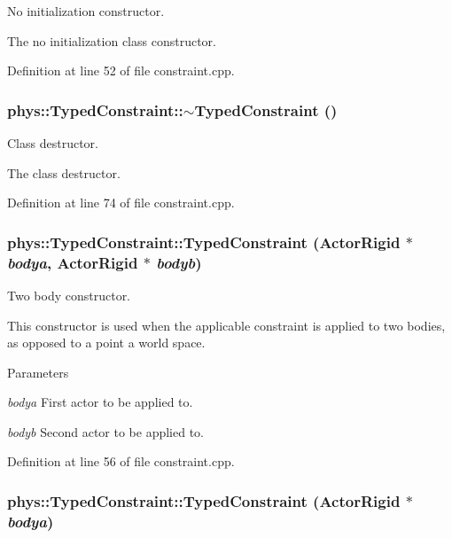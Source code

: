 No initialization constructor. 

The no initialization class constructor. 

Definition at line 52 of file constraint.cpp.

\hypertarget{classphys_1_1TypedConstraint_abf1cb6e3cf5c62feac31805162ec2766}{
\subsubsection[{$\sim$TypedConstraint}]{\setlength{\rightskip}{0pt plus 5cm}phys::TypedConstraint::$\sim$TypedConstraint ()}}
\label{d1/d17/classphys_1_1TypedConstraint_abf1cb6e3cf5c62feac31805162ec2766}


Class destructor. 

The class destructor. 

Definition at line 74 of file constraint.cpp.

\hypertarget{classphys_1_1TypedConstraint_a50ca8631a6c75bbc609c8d4ed61fdcee}{
\subsubsection[{TypedConstraint}]{\setlength{\rightskip}{0pt plus 5cm}phys::TypedConstraint::TypedConstraint ({\bf ActorRigid} $\ast$ {\em bodya}, \/  {\bf ActorRigid} $\ast$ {\em bodyb})}}
\label{d1/d17/classphys_1_1TypedConstraint_a50ca8631a6c75bbc609c8d4ed61fdcee}


Two body constructor. 

This constructor is used when the applicable constraint is applied to two bodies, as opposed to a point a world space. 
\begin{DoxyParams}{Parameters}
\item[{\em bodya}]First actor to be applied to. \item[{\em bodyb}]Second actor to be applied to. \end{DoxyParams}


Definition at line 56 of file constraint.cpp.

\hypertarget{classphys_1_1TypedConstraint_a41ad08bfde377e91f2b37b0af40a9d34}{
\subsubsection[{TypedConstraint}]{\setlength{\rightskip}{0pt plus 5cm}phys::TypedConstraint::TypedConstraint ({\bf ActorRigid} $\ast$ {\em bodya})}}
\label{d1/d17/classphys_1_1TypedConstraint_a41ad08bfde377e91f2b37b0af40a9d34}


